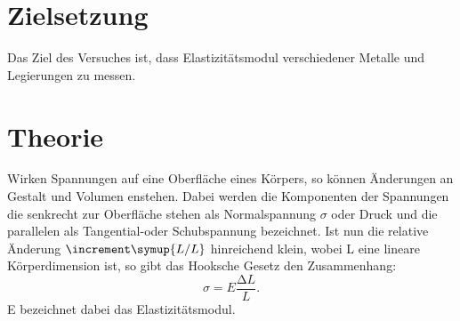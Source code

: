 
\section{Zielsetzung}
Das Ziel des Versuches ist, dass Elastizitätsmodul verschiedener Metalle und
Legierungen zu messen. %
\section{Theorie}
\label{sec:Theorie}
Wirken Spannungen auf eine Oberfläche eines Körpers, so können Änderungen an
Gestalt und Volumen enstehen. Dabei werden die Komponenten der Spannungen die
senkrecht zur Oberfläche stehen als Normalspannung $\sigma$ oder Druck und die
parallelen als Tangential-oder Schubspannung bezeichnet. Ist nun die relative
Änderung $ \increment \symup{L /L} $ hinreichend klein, wobei L eine lineare Körperdimension
ist, so gibt das Hooksche Gesetz den Zusammenhang:
\begin{equation}
  \sigma = E\frac{\increment L}{L}.
  \label{eqn:hook}
\end{equation}
E bezeichnet dabei das Elastizitätsmodul.

